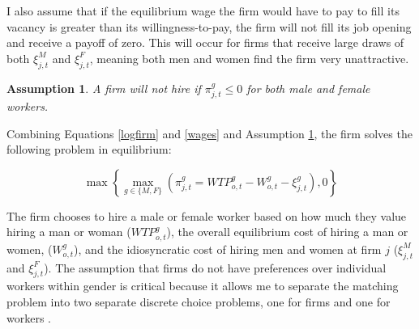 \documentclass[12pt]{article}
\newtheorem{assumption}{Assumption}
\begin{document}






I also assume that if the equilibrium wage the firm would have to pay to fill its vacancy is greater than its willingness-to-pay, the firm will not fill its job opening and receive a payoff of zero. This will occur for firms that receive large draws of both $\xi^M_{j,t}$ and $\xi^F_{j,t}$, meaning both men and women find the firm very unattractive.

\begin{assumption}\label{nonneg}
A firm will not hire if $\pi^g_{j,t} \leq 0$ for both male and female workers.
\end{assumption}

Combining Equations \ref{logfirm} and \ref{wages} and Assumption \ref{nonneg}, the firm solves the following problem in equilibrium:

\[
\max \left \{ \max_{g \in \{M,F\}}  (\pi^g_{j,t} =  WTP^g_{o,t} -  W^g_{o,t} - \xi^g_{j,t}), 0 \right  \} %
\]



The firm chooses to hire a male or female worker based on how much they value hiring a man or woman ($WTP^g_{o,t}$), the overall equilibrium cost of hiring a man or women, ($W^g_{o,t}$), and the idiosyncratic cost of hiring men and women at firm $j$ ($\xi^M_{j,t}$ and $\xi^F_{j,t}$). The assumption that firms do not have preferences over individual workers within gender is critical because it allows me to separate the matching problem into two separate discrete choice problems, one for firms and one for workers \cite{Galichon2015}. 

\end{document}
